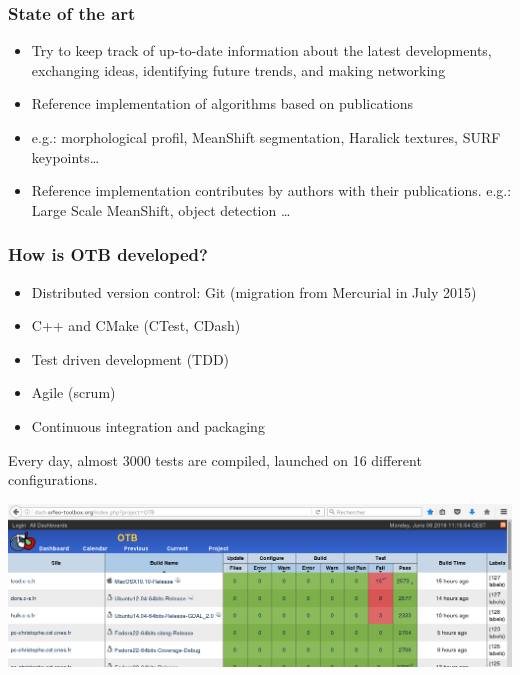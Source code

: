 \documentclass[8pt]{beamer}
\begin{document}
\begin{frame}
\frametitle{State of the art}
\begin{itemize}
\item Try to keep track of up-to-date information about the latest developments, exchanging ideas, identifying future trends, and making networking
\item Reference implementation of algorithms based on publications
\item e.g.: morphological profil, MeanShift segmentation, Haralick textures, SURF keypoints\ldots
\item Reference implementation contributes by authors with their
  publications. e.g.: Large Scale MeanShift, object detection \ldots
\end{itemize}
\end{frame}

\begin{frame}
\frametitle{How is OTB developed?}
\vspace{-0.5cm}
\begin{itemize}
\item Distributed version control: Git (migration from Mercurial in July 2015)
\item C++ and CMake (CTest, CDash)
\item Test driven development (TDD)
\item Agile (scrum)
\item Continuous integration and packaging
\end{itemize}
Every day, almost 3000 tests are compiled, launched on 16 different
configurations.
\begin{center}
\href{http://dash.orfeo-toolbox.org/index.php?project=OTB}{\includegraphics[width=\textwidth]{images/dashboard.png}}
\end{center}
\end{frame}
\end{document}
